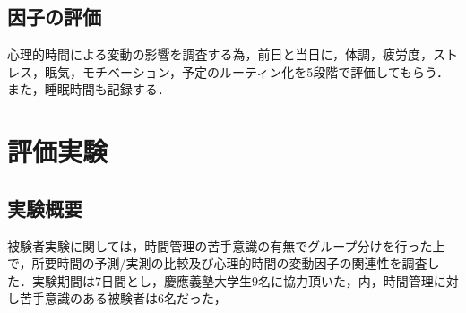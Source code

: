 \subsection{因子の評価}
心理的時間による変動の影響を調査する為，前日と当日に，体調，疲労度，ストレス，眠気，モチベーション，予定のルーティン化を5段階で評価してもらう．また，睡眠時間も記録する．

\section{評価実験}
\subsection{実験概要}
被験者実験に関しては，時間管理の苦手意識の有無でグループ分けを行った上で，所要時間の予測/実測の比較及び心理的時間の変動因子の関連性を調査した．実験期間は7日間とし，慶應義塾大学生9名に協力頂いた，内，時間管理に対し苦手意識のある被験者は6名だった，
